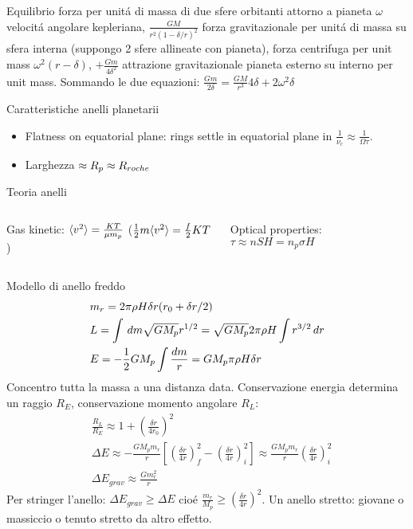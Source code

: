 \begin{wordonframe}{Equilibrio forza per unit\'a di massa di due sfere orbitanti attorno a pianeta}
$\omega$ velocit\'a angolare kepleriana, $\frac{GM}{r^2(1-\delta/r)^2}$ forza gravitazionale per unit\'a di massa su sfera interna (suppongo 2 sfere allineate con pianeta), forza centrifuga per unit mass $\omega^2(r-\delta)$, $+\frac{Gm}{4\delta^2}$ attrazione gravitazionale pianeta esterno su interno per unit mass.
Sommando le due equazioni: $\frac{Gm}{2\delta}=\frac{GM}{r^3}4\delta+2\omega^2\delta$
\end{wordonframe}

\begin{frame}{Caratteristiche anelli planetarii}
\begin{itemize}
\item Flatness on equatorial plane: rings settle in equatorial plane in $\frac{1}{\nu_c}\approx \frac{1}{\Omega\tau}$.
\item Larghezza $\approx R_p\approx R_{roche}{}$
\end{itemize}
\end{frame}

\begin{wordonframe}{Teoria anelli}
\begin{columns}[T]
\begin{column}{0.5\textwidth}
Gas kinetic: $\langle v^2 \rangle=\frac{KT}{\mu m_p}$ ($\frac{1}{2}m\langle v^2 \rangle=\frac{f}{2}KT$)
\end{column} \begin{column}{0.5\textwidth}
Optical properties: $\tau\approx nSH=n_p\sigma H$
\end{column}  \end{columns}
\end{wordonframe}

\begin{frame}{Modello di anello freddo}
\begin{align*}
&m_r=2\pi\rho H\delta r(r_0+\delta r/2)\\
&L=\int\,dm\sqrt{GM_p}r^{1/2}=\sqrt{GM_p}2\pi\rho H\int r^{3/2}\,dr\\
&E=-\frac{1}{2}GM_p\int \frac{dm}{r}=GM_p\pi\rho H \delta r
\end{align*}
Concentro tutta la massa a una distanza data. Conservazione energia determina un raggio $R_E$, conservazione momento angolare $R_L$:
\begin{align*}
&\frac{R_L}{R_E}\approx1+(\frac{\delta r}{4r_0})^2\\
&\Delta E\approx -\frac{GM_pm_r}{r}[(\frac{\delta r}{4r})^2_f-(\frac{\delta r}{4r})^2_i]\approx\frac{GM_pm_r}{r}(\frac{\delta r}{4r})^2_i\\
&\Delta E_{grav}\approx\frac{Gm_r^2}{r}
\end{align*}
Per stringer l'anello: $\Delta E_{grav}\geq\Delta E$ cio\'e $\frac{m_r}{M_p}\geq(\frac{\delta r}{4r})^2$.
Un anello stretto: giovane o massiccio o tenuto stretto da altro effetto.
\end{frame}

